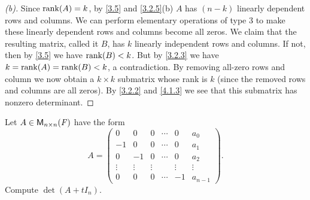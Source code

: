 \begin{proof}[(b)]
	Since \(\rk{A} = k\), by \cref{3.5} and \cref{3.2.5}(b) \(A\) has \((n - k)\) linearly dependent rows and columns.
	We can perform elementary operations of type 3 to make these linearly dependent rows and columns become all zeros.
	We claim that the resulting matrix, called it \(B\), has \(k\) linearly independent rows and columns.
	If not, then by \cref{3.5} we have \(\rk{B} < k\).
	But by \cref{3.2.3} we have \(k = \rk{A} = \rk{B} < k\), a contradiction.
	By removing all-zero rows and column we now obtain a \(k \times k\) submatrix whose rank is \(k\) (since the removed rows and columns are all zeros).
	By \cref{3.2.2} and \cref{4.1.3} we see that this submatrix has nonzero determinant.
\end{proof}

\begin{ex}\label{ex:4.2.24}
	Let \(A \in \ms[n][n][\F]\) have the form
	\[
		A = \begin{pmatrix}
			0      & 0      & 0      & \cdots & 0      & a_0       \\
			-1     & 0      & 0      & \cdots & 0      & a_1       \\
			0      & -1     & 0      & \cdots & 0      & a_2       \\
			\vdots & \vdots & \vdots &        & \vdots & \vdots    \\
			0      & 0      & 0      & \cdots & -1     & a_{n - 1}
		\end{pmatrix}.
	\]
	Compute \(\det(A + t I_n)\).
\end{ex}

